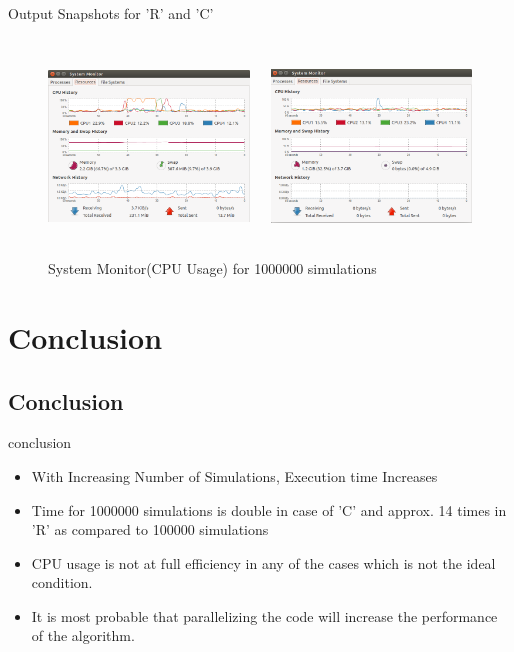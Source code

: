 \documentclass{beamer}
\begin{document}
\begin{frame}{Output Snapshots for 'R' and 'C'}{}
\begin{figure}
\begin{columns}[t]

\includegraphics[width=6cm,height=5cm]{1000000_sys_mon}\\


\includegraphics[width=6cm,height=5cm]{CPU_usage_GBM_seq}\\

\end{columns}

\caption{System Monitor(CPU Usage) for 1000000 simulations}

\end{figure}
  
\end{frame}


\section{Conclusion}
\subsection{Conclusion}
\begin{frame}{conclusion}{}
  \begin{itemize}
  \item {
    With Increasing Number of Simulations, Execution time Increases
  }
  \item {
   Time for 1000000 simulations is double in case of 'C' and approx. 14 times in 'R' as compared to 100000 simulations
   }
  \item {
    CPU usage is not at full efficiency in any of the cases which is not the ideal condition.
  }
  \item {
   It is most probable that parallelizing the code will increase the performance of the algorithm.
  }
    
  \end{itemize}
    
\end{frame}
\end{document}
